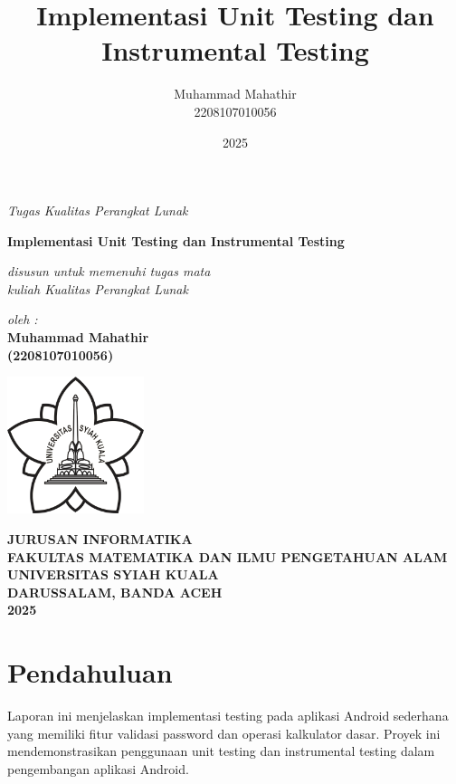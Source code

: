 \documentclass[12pt,a4paper]{article}
\title{\textbf{Implementasi Unit Testing dan Instrumental Testing}}
\author{Muhammad Mahathir\\2208107010056}
\date{2025}
\begin{document}
\begin{titlepage}
    \flushleft
    {\normalsize\textit{Tugas Kualitas Perangkat Lunak}}
    
    \vspace{1cm}
    
    \begin{center}
        {\Large\textbf{Implementasi Unit Testing dan Instrumental Testing}}
        
        \vspace{1.5cm}
        
        {\normalsize\textit{disusun untuk memenuhi tugas mata\\kuliah Kualitas Perangkat Lunak}}
        
        \vspace{1.5cm}
        
        {\normalsize\textit{oleh :}}\\
        \vspace{0.5cm}
        {\normalsize\textbf{Muhammad Mahathir}}\\
        {\normalsize\textbf{(2208107010056)}}
        
        \vspace{2.5cm}
        
        \includegraphics[width=0.3\textwidth]{images/logo_unsyiah.png}
        
        \vfill
        
        {\normalsize\textbf{JURUSAN INFORMATIKA}}\\
        {\normalsize\textbf{FAKULTAS MATEMATIKA DAN ILMU PENGETAHUAN ALAM}}\\
        {\normalsize\textbf{UNIVERSITAS SYIAH KUALA}}\\
        {\normalsize\textbf{DARUSSALAM, BANDA ACEH}}\\
        {\normalsize\textbf{2025}}
    \end{center}
\end{titlepage}

\section{Pendahuluan}
Laporan ini menjelaskan implementasi testing pada aplikasi Android sederhana yang memiliki fitur validasi password dan operasi kalkulator dasar. Proyek ini mendemonstrasikan penggunaan unit testing dan instrumental testing dalam pengembangan aplikasi Android.
\end{document}
